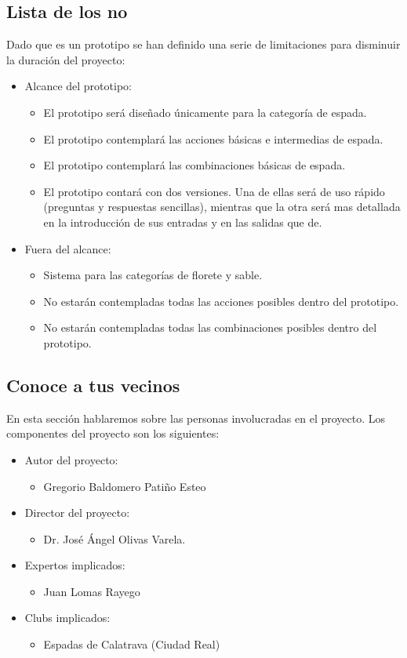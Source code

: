 \subsection{Lista de los no}
Dado que es un prototipo se han definido una serie de limitaciones para disminuir la duración
del proyecto:
\begin{itemize}
  \item Alcance del prototipo:
    \begin{itemize}
      \item El prototipo será diseñado únicamente para la categoría de espada.
      \item El prototipo contemplará las acciones básicas e intermedias de espada.
      \item El prototipo contemplará las combinaciones básicas de espada.
      \item El prototipo contará con dos versiones. Una de ellas será de uso rápido
        (preguntas y respuestas sencillas), mientras que la otra será mas detallada
        en la introducción de sus entradas y en las salidas que de.
    \end{itemize}
  \item Fuera del alcance:
    \begin{itemize}
      \item Sistema para las categorías de florete y sable.
      \item No estarán contempladas todas las acciones posibles dentro del prototipo.
      \item No estarán contempladas todas las combinaciones posibles dentro del prototipo.
    \end{itemize}
\end{itemize}

\subsection{Conoce a tus vecinos}
En esta sección hablaremos sobre las personas involucradas en el proyecto. Los componentes
del proyecto son los siguientes:
\begin{itemize}
  \item Autor del proyecto:
    \begin{itemize}
      \item Gregorio Baldomero Patiño Esteo
    \end{itemize}
  \item Director del proyecto:
    \begin{itemize}
      \item Dr. José Ángel Olivas Varela.
    \end{itemize}
  \item Expertos implicados:
    \begin{itemize}
      \item Juan Lomas Rayego
    \end{itemize}
  \item Clubs implicados:
    \begin{itemize}
      \item Espadas de Calatrava (Ciudad Real)
    \end{itemize}
\end{itemize}


